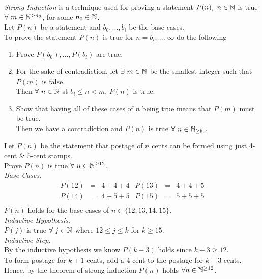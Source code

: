 \documentclass[11pt,a4paper]{article}
\begin{document}
\textit{Strong Induction} is a technique used for proving a statement $P(n),\ n\in\mathbb{N}$ is true $\forall\ m\in\mathbb{N}^{>n_0}$, for some $n_0\in\mathbb{N}$.\\

Let $P(n)$ be a statement and $b_0,\dots,b_i$ be the base cases.\\
To prove the statement $P(n)$ is true for $n=b_i,\dots,\infty$ do the following
\begin{enumerate}
  \item Prove $P(b_0),\dots,P(b_i)$ are true.
  \item For the sake of contradiction, let $\exists\ m\in\mathbb{N}$ be the smallest integer such that $P(m)$ is false.\\
        Then $\forall\ n \in \mathbb{N}$ st $b_i \leq n < m$, $P(n)$ is true.
  \item Show that having all of these cases of $n$ being true means that $P(m)$ must be true.\\
        Then we have a contradiction and $P(n)$ is true $\forall\ n \in \mathbb{N}_{\geq b_i}$.
\end{enumerate}

Let $P(n)$ be the statement that postage of $n$ cents can be formed using just 4-cent \& 5-cent stamps.\\
Prove $P(n)$ is true $\forall\ n\in\nats^{\geq12}$.\\
\textit{Base Cases}.\\
\[\begin{array}{rclrcl}
P(12)&=&4+4+4&P(13)&=&4+4+5\\
P(14)&=&4+5+5&P(15)&=&5+5+5\\
\end{array}\]
$P(n)$ holds for the base cases of $n\in\{12,13,14,15\}$.\\
\textit{Inductive Hypothesis}.\\
$P(j)$ is true $\forall\ j\in\mathbb{N}$ where $12\leq j\leq k$ for $k\geq 15$.\\
\textit{Inductive Step}.\\
By the inductive hypothesis we know $P(k-3)$ holds since $k-3\geq 12$.\\
To form postage for $k+1$ cents, add a 4-cent to the postage for $k-3$ cents.\\
Hence, by the theorem of strong induction $P(n)$ holds $\forall n\in\mathbb{N}^{\geq12}$.\\
\end{document}
